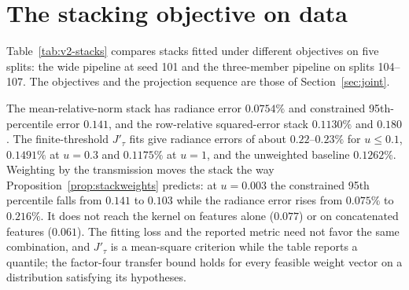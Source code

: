 \section{The stacking objective on data}\label{sec:results-stacks}

Table~\ref{tab:v2-stacks} compares stacks fitted under different objectives on five splits:
the wide pipeline at seed 101 and the three-member pipeline on splits 104--107. The objectives
and the projection sequence are those of Section~\ref{sec:joint}.

\begin{table}[p]
\centering

\caption{Stacks under different fitting objectives at $\rho=0.7$, five splits. The
finite-threshold rows use the separable quadratic $J'_\tau$ of \eqref{eq:Jtau-sep}, with
$u=\tau/T_{\rm train}$; the unweighted row is a component squared-error baseline. Radiance is in
percent and the reflectance percentiles in reflectance units. Weights are fitted approximately,
as described in Section~\ref{sec:joint}.}
\label{tab:v2-stacks}
\end{table}

The mean-relative-norm stack has radiance error $0.0754\%$ and constrained 95th-percentile
error $0.141$, and the row-relative squared-error stack $0.1130\%$ and $0.180$. The
finite-threshold $J'_\tau$ fits give radiance errors of about $0.22$--$0.23\%$ for $u\le0.1$,
$0.1491\%$ at $u=0.3$ and $0.1175\%$ at $u=1$, and the unweighted baseline $0.1262\%$.
Weighting by the transmission moves the stack the way Proposition~\ref{prop:stackweights}
predicts: at $u=0.003$ the constrained 95th percentile falls from $0.141$ to $0.103$ while the
radiance error rises from $0.075\%$ to $0.216\%$. It does not reach the kernel on features alone
($0.077$) or on concatenated features ($0.061$). The fitting loss and the reported metric need
not favor the same combination, and $J'_\tau$ is a mean-square criterion while the table reports
a quantile; the factor-four transfer bound holds for every feasible weight vector on a
distribution satisfying its hypotheses.

